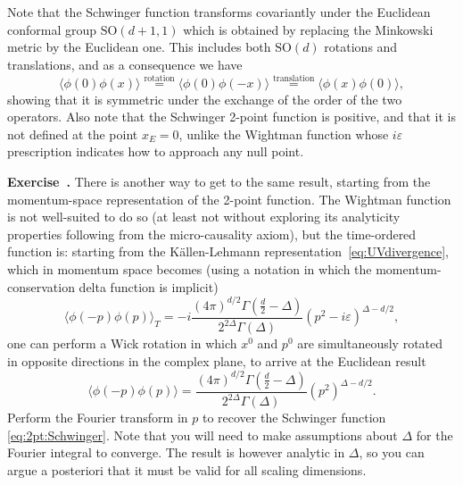 \documentclass[a4paper,12pt]{article}
\newcommand{\SO}{\text{SO}}
\numberwithin{equation}{section}
\newcounter{exercise}[section]
\newenvironment{exercise}[1][]%
	{\refstepcounter{exercise}\bigskip
	\begin{mdframed}[backgroundcolor=gray!20, linewidth=0]
	\noindent\textbf{Exercise~\thesection.\theexercise #1} \rmfamily}
  	{\end{mdframed}\bigskip}
\begin{document}
Note that the Schwinger function transforms covariantly under the Euclidean conformal group $\SO(d + 1, 1)$ which is obtained by replacing the Minkowski metric by the Euclidean one. This includes both $\SO(d)$ rotations and translations, and as a consequence we have
\begin{equation}
	\langle \phi(0) \phi(x) \rangle
	\stackrel{\text{rotation}}{=} \langle \phi(0) \phi(-x) \rangle
	\stackrel{\text{translation}}{=} \langle \phi(x) \phi(0) \rangle,
\end{equation}
showing that it is symmetric under the exchange of the order of the two operators.
Also note that the Schwinger 2-point function is positive, and that it is not defined at the point $x_E = 0$, unlike the Wightman function whose $i \varepsilon$ prescription indicates how to approach any null point.
%
\begin{exercise}
	There is another way to get to the same result, starting from
	the momentum-space representation of the 2-point function. 
	The Wightman function is not well-suited to do so
	(at least not without exploring its analyticity properties 
	following from the micro-causality axiom),
	but the time-ordered function is: starting from the
	Källen-Lehmann representation~\eqref{eq:UVdivergence},
	which in momentum space becomes (using a notation in which the 
	momentum-conservation delta function is implicit)
	$$
	\langle \phi(-p) \phi(p) \rangle_T
	= -i
	\frac{(4\pi)^{d/2} \Gamma\left( \frac{d}{2} - \Delta \right)}
	{2^{2\Delta} \Gamma(\Delta)}
	\left( p^2 - i \varepsilon \right)^{\Delta - d/2},
	$$
	one can perform a Wick rotation in which $x^0$ and $p^0$
	are simultaneously rotated  in opposite directions
	in the complex plane, to arrive at the Euclidean result
	$$
	\langle \phi(-p) \phi(p) \rangle
	= 
	\frac{(4\pi)^{d/2} \Gamma\left( \frac{d}{2} - \Delta \right)}
	{2^{2\Delta} \Gamma(\Delta)}
	\left( p^2  \right)^{\Delta - d/2}.
	$$
	Perform the Fourier transform in $p$ to recover the 
	Schwinger function \eqref{eq:2pt:Schwinger}.
	Note that you will need to make assumptions about $\Delta$
	for the Fourier integral to converge. The result is 
	however analytic in $\Delta$, so you can argue a posteriori
	that it must be valid for all scaling dimensions.
\end{exercise}
\end{document}
